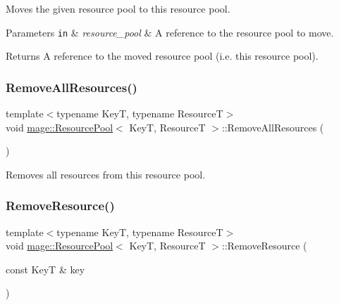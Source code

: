 Moves the given resource pool to this resource pool.


\begin{DoxyParams}[1]{Parameters}
\mbox{\tt in}  & {\em resource\+\_\+pool} & A reference to the resource pool to move. \\
\hline
\end{DoxyParams}
\begin{DoxyReturn}{Returns}
A reference to the moved resource pool (i.\+e. this resource pool). 
\end{DoxyReturn}
\hypertarget{classmage_1_1_resource_pool_a83a33e15bd8f326d0ebc11b3f8e52a41}{}\label{classmage_1_1_resource_pool_a83a33e15bd8f326d0ebc11b3f8e52a41} 
\subsubsection{\texorpdfstring{Remove\+All\+Resources()}{RemoveAllResources()}}
{\footnotesize\ttfamily template$<$typename KeyT, typename ResourceT$>$ \\
void \hyperlink{classmage_1_1_resource_pool}{mage\+::\+Resource\+Pool}$<$ KeyT, ResourceT $>$\+::Remove\+All\+Resources (\begin{DoxyParamCaption}{ }\end{DoxyParamCaption})}

Removes all resources from this resource pool. \hypertarget{classmage_1_1_resource_pool_a56680a516f219bcf69bf5c8aaebdfeed}{}\label{classmage_1_1_resource_pool_a56680a516f219bcf69bf5c8aaebdfeed} 
\subsubsection{\texorpdfstring{Remove\+Resource()}{RemoveResource()}}
{\footnotesize\ttfamily template$<$typename KeyT, typename ResourceT$>$ \\
void \hyperlink{classmage_1_1_resource_pool}{mage\+::\+Resource\+Pool}$<$ KeyT, ResourceT $>$\+::Remove\+Resource (\begin{DoxyParamCaption}\item[{const KeyT \&}]{key }\end{DoxyParamCaption})}

